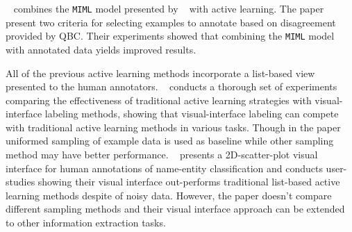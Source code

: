 \documentclass[11pt,a4paper]{article}
\begin{document}
    ~\citet{angeli2014combining} combines the \texttt{MIML} model presented by ~\citet{surdeanu2012multi} with active learning. The paper present two criteria for selecting examples to annotate based on disagreement provided by QBC. Their experiments showed that combining the \texttt{MIML} model with annotated data yields improved results.

    All of the previous active learning methods incorporate a list-based view presented to the human annotators. ~\citet{bernard2018comparing} conducts a thorough set of experiments comparing the effectiveness of traditional active learning strategies with visual-interface labeling methods, showing that visual-interface labeling can compete with traditional active learning methods in various tasks. Though in the paper uniformed sampling of example data is used as baseline while other sampling method may have better performance. ~\citet{berger2014visual} presents a 2D-scatter-plot visual interface for human annotations of name-entity classification and conducts user-studies showing their visual interface out-performs traditional list-based active learning methods despite of noisy data. However, the paper doesn't compare different sampling methods and their visual interface approach can be extended to other information extraction tasks.
  
  
  
  
\end{document}
